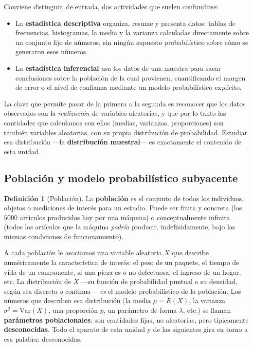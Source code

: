 \documentclass[11pt,a4paper]{article}
\theoremstyle{plain}
\theoremstyle{definition}
\newtheorem{definicion}[teorema]{Definición}
\theoremstyle{remark}
\begin{document}
Conviene distinguir, de entrada, dos actividades que suelen confundirse:

\begin{itemize}
\item La \textbf{estadística descriptiva} organiza, resume y presenta datos: tablas de frecuencias, histogramas, la media y la varianza calculadas directamente sobre un conjunto fijo de números, sin ningún supuesto probabilístico sobre cómo se generaron esos números.
\item La \textbf{estadística inferencial} usa los datos de una muestra para sacar conclusiones sobre la población de la cual provienen, cuantificando el margen de error o el nivel de confianza mediante un modelo probabilístico explícito.
\end{itemize}

La clave que permite pasar de la primera a la segunda es reconocer que los datos observados son la \emph{realización} de variables aleatorias, y que por lo tanto las cantidades que calculamos con ellos (medias, varianzas, proporciones) son también variables aleatorias, con su propia distribución de probabilidad. Estudiar esa distribución —la \textbf{distribución muestral}— es exactamente el contenido de esta unidad.

\subsection{Población y modelo probabilístico subyacente}

\begin{definicion}[Población]
La \textbf{población} es el conjunto de todos los individuos, objetos o mediciones de interés para un estudio. Puede ser finita y concreta (los $5000$ artículos producidos hoy por una máquina) o conceptualmente infinita (todos los artículos que la máquina \emph{podría} producir, indefinidamente, bajo las mismas condiciones de funcionamiento).
\end{definicion}

A cada población le asociamos una variable aleatoria $X$ que describe numéricamente la característica de interés: el peso de un paquete, el tiempo de vida de un componente, si una pieza es o no defectuosa, el ingreso de un hogar, etc. La distribución de $X$ —su función de probabilidad puntual o su densidad, según sea discreta o continua— \emph{es} el modelo probabilístico de la población. Los números que describen esa distribución (la media $\mu = E(X)$, la varianza $\sigma^2 = \mathrm{Var}(X)$, una proporción $p$, un parámetro de forma $\lambda$, etc.) se llaman \textbf{parámetros poblacionales}: son cantidades fijas, no aleatorias, pero típicamente \textbf{desconocidas}. Todo el aparato de esta unidad y de las siguientes gira en torno a esa palabra: desconocidas.
\end{document}
